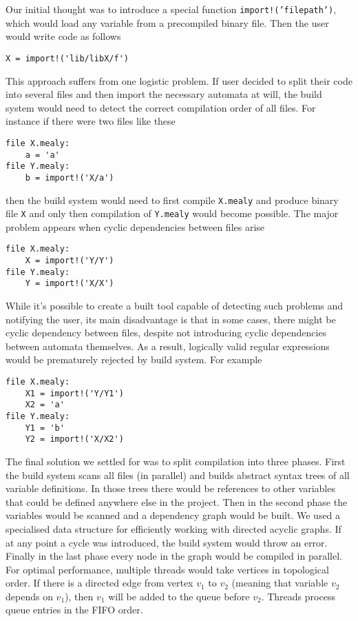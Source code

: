 Our initial thought was to introduce a special function \texttt{import!('filepath')}, which would load any variable from a precompiled binary file. Then the user would write code as follows
\begin{lstlisting}
X = import!('lib/libX/f')
\end{lstlisting}
This approach suffers from one logistic problem. If user decided to split their code into several files and then import the necessary automata at will, the build system would need to detect the correct compilation order of all files. For instance if there were two files like these
\begin{lstlisting}
file X.mealy:
    a = 'a'
file Y.mealy:
    b = import!('X/a')
\end{lstlisting}
then the build system would need to first compile \texttt{X.mealy} and produce binary file \texttt{X} and only then compilation of \texttt{Y.mealy} would become possible. The major problem appears when cyclic dependencies between files arise
\begin{lstlisting}
file X.mealy:
    X = import!('Y/Y')
file Y.mealy:
    Y = import!('X/X')
\end{lstlisting}
While it's possible to create a built tool capable of detecting such problems and notifying the user, its main disadvantage is that in some cases, there might be cyclic dependency between files, despite not introducing cyclic dependencies between automata themselves. As a result, logically valid regular expressions would be prematurely rejected by build system. For example
\begin{lstlisting}
file X.mealy:
    X1 = import!('Y/Y1')
    X2 = 'a'
file Y.mealy:
    Y1 = 'b'
    Y2 = import!('X/X2')
\end{lstlisting}
The final solution we settled for was to split compilation into three phases. First the build system scans all files (in parallel) and builds abstract syntax trees of all variable definitions. In those trees there would be references to other variables that could be defined anywhere else in the project. Then in the second phase the variables would be scanned and a dependency graph would be built. We used a specialised data structure for efficiently working with directed acyclic graphs. If at any point a cycle was introduced, the build system would throw an error. Finally in the last phase every node in the graph would be compiled in parallel. For optimal performance, multiple threads would take vertices in topological order. If there is a directed edge from vertex $v_1$ to $v_2$ (meaning that variable $v_2$ depends on $v_1$), then $v_1$ will be added to the queue before $v_2$. Threads process queue entries in the FIFO order. 

